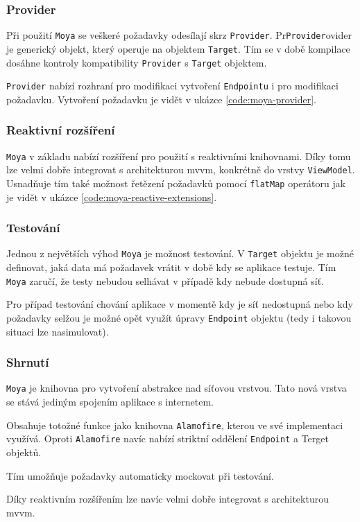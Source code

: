 \subsubsection*{Provider}

Při použití \texttt{Moya} se veškeré požadavky odesílají skrz \texttt{Provider}.
Pr\texttt{Provider}ovider je generický objekt, který operuje na objektem \texttt{Target}.
Tím se v době kompilace dosáhne kontroly kompatibility \texttt{Provider} s \texttt{Target} objektem.

\texttt{Provider} nabízí rozhraní pro modifikaci vytvoření \texttt{Endpointu} i pro modifikaci požadavku.
Vytvoření požadavku je vidět v ukázce \ref{code:moya-provider}.


\subsubsection*{Reaktivní rozšíření}

\texttt{Moya} v základu nabízí rozšíření pro použití s reaktivními knihovnami.
Díky tomu lze velmi dobře integrovat s architekturou \acrshort{mvvm}, konkrétně do vrstvy \texttt{ViewModel}.
Usnadňuje tím také možnost řetězení požadavků pomocí \texttt{flatMap} operátoru jak je vidět v ukázce \ref{code:moya-reactive-extensions}.


\subsubsection*{Testování}

Jednou z největších výhod \texttt{Moya} je možnost testování.
V \texttt{Target} objektu je možné definovat, jaká data má požadavek vrátit v době kdy se aplikace testuje.
Tím \texttt{Moya} zaručí, že testy nebudou selhávat v případě kdy nebude dostupná síť.

Pro případ testování chování aplikace v momentě kdy je síť nedostupná nebo kdy požadavky selžou je možné opět využít úpravy \texttt{Endpoint} objektu (tedy i takovou situaci lze nasimulovat).

\subsubsection*{Shrnutí}

\texttt{Moya} je knihovna pro vytvoření abstrakce nad síťovou vrstvou.
Tato nová vrstva se stává jediným spojením aplikace s internetem.

Obsahuje totožné funkce jako knihovna \texttt{Alamofire}, kterou ve své implementaci využívá.
Oproti \texttt{Alamofire} navíc nabízí striktní oddělení \texttt{Endpoint} a Terget objektů.

Tím umožňuje požadavky automaticky mockovat při testování.

Díky reaktivním rozšířením lze navíc velmi dobře integrovat s architekturou \acrshort{mvvm}.